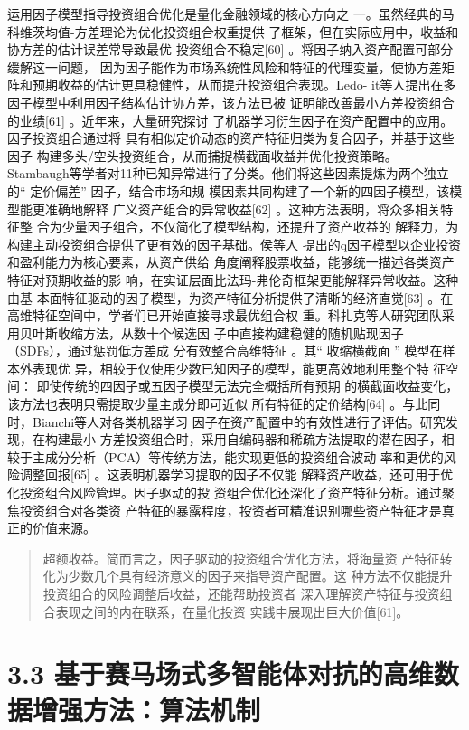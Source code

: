 \documentclass[UTF8]{ctexart}
\begin{document}
运用因子模型指导投资组合优化是量化金融领域的核心方向之
一。虽然经典的马科维茨均值-方差理论为优化投资组合权重提供
了框架，但在实际应用中，收益和协方差的估计误差常导致最优
投资组合不稳定{[}60{]} 。将因子纳入资产配置可部分缓解这一问题，
因为因子能作为市场系统性风险和特征的代理变量，使协方差矩
阵和预期收益的估计更具稳健性，从而提升投资组合表现。Ledo-
it等人提出在多因子模型中利用因子结构估计协方差，该方法已被
证明能改善最小方差投资组合的业绩{[}61{]} 。近年来，大量研究探讨
了机器学习衍生因子在资产配置中的应用。因子投资组合通过将
具有相似定价动态的资产特征归类为复合因子，并基于这些因子
构建多头/空头投资组合，从而捕捉横截面收益并优化投资策略。
Stambaugh等学者对11种已知异常进行了分类。他们将这些因素提炼为两个独立的``
定价偏差'' 因子，结合市场和规
模因素共同构建了一个新的四因子模型，该模型能更准确地解释
广义资产组合的异常收益{[}62{]} 。这种方法表明，将众多相关特征整
合为少量因子组合，不仅简化了模型结构，还提升了资产收益的
解释力，为构建主动投资组合提供了更有效的因子基础。侯等人
提出的q因子模型以企业投资和盈利能力为核心要素，从资产供给
角度阐释股票收益，能够统一描述各类资产特征对预期收益的影
响，在实证层面比法玛-弗伦奇框架更能解释异常收益。这种由基
本面特征驱动的因子模型，为资产特征分析提供了清晰的经济直觉{[}63{]}
。在高维特征空间中，学者们已开始直接寻求最优组合权
重。科扎克等人研究团队采用贝叶斯收缩方法，从数十个候选因
子中直接构建稳健的随机贴现因子（SDFs），通过惩罚低方差成
分有效整合高维特征 。其`` 收缩横截面 '' 模型在样本外表现优
异，相较于仅使用少数已知因子的模型，能更高效地利用整个特 征空间：
即使传统的四因子或五因子模型无法完全概括所有预期
的横截面收益变化，该方法也表明只需提取少量主成分即可近似
所有特征的定价结构{[}64{]} 。与此同时，Bianchi等人对各类机器学习
因子在资产配置中的有效性进行了评估。研究发现，在构建最小
方差投资组合时，采用自编码器和稀疏方法提取的潜在因子，相较于主成分分析（PCA）等传统方法，能实现更低的投资组合波动
率和更优的风险调整回报{[}65{]} 。这表明机器学习提取的因子不仅能
解释资产收益，还可用于优化投资组合风险管理。因子驱动的投
资组合优化还深化了资产特征分析。通过聚焦投资组合对各类资
产特征的暴露程度，投资者可精准识别哪些资产特征才是真正的价值来源。

\begin{quote}
超额收益。简而言之，因子驱动的投资组合优化方法，将海量资
产特征转化为少数几个具有经济意义的因子来指导资产配置。这
种方法不仅能提升投资组合的风险调整后收益，还能帮助投资者
深入理解资产特征与投资组合表现之间的内在联系，在量化投资
实践中展现出巨大价值{[}61{]}。
\end{quote}

\section{3.3
基于赛马场式多智能体对抗的高维数据增强方法：算法机制}\label{ux57faux4e8eux8d5bux9a6cux573aux5f0fux591aux667aux80fdux4f53ux5bf9ux6297ux7684ux9ad8ux7ef4ux6570ux636eux589eux5f3aux65b9ux6cd5ux7b97ux6cd5ux673aux5236}
\end{document}
